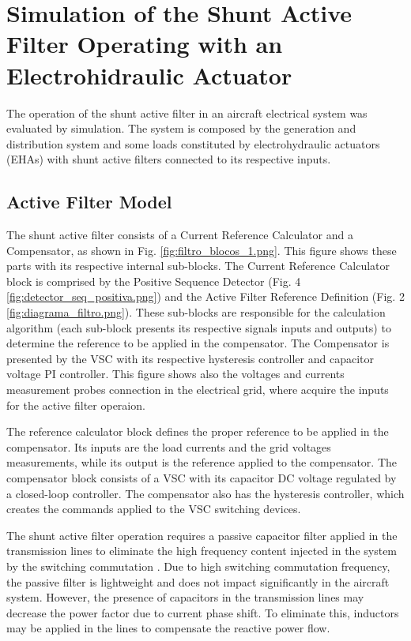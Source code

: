 \section{Simulation of the Shunt Active Filter Operating with an Electrohidraulic Actuator}

The operation of the shunt active filter in an aircraft electrical system was evaluated by simulation. The system is composed by the generation and distribution system and some loads constituted by electrohydraulic actuators (EHAs) with shunt active filters connected to its respective inputs.

\subsection{Active Filter Model}

The shunt active filter consists of a Current Reference Calculator and a Compensator, as shown in Fig. \ref{fig:filtro_blocos_1.png}. This figure shows these parts with its respective internal sub-blocks. The Current Reference Calculator block is comprised by the Positive Sequence Detector (Fig. 4 \ref{fig:detector_seq_positiva.png}) and the Active Filter Reference Definition (Fig. 2 \ref{fig:diagrama_filtro.png}). These sub-blocks are responsible for the calculation algorithm (each sub-block presents its respective signals inputs and outputs) to determine the reference to be applied in the compensator. The Compensator is presented by the VSC with its respective hysteresis controller and capacitor voltage PI controller. This figure shows also the voltages and currents measurement probes connection in the electrical grid, where acquire the inputs for the active filter operaion.

The reference calculator block defines the proper reference to be applied in the compensator. Its inputs are the load currents and the grid voltages measurements, while its output is the reference applied to the compensator. The compensator block consists of a VSC with its capacitor DC voltage regulated by a closed-loop controller. The compensator also has the hysteresis controller, which creates the commands applied to the VSC switching devices.

The shunt active filter operation requires a passive capacitor filter applied in the transmission lines to eliminate the high frequency content injected in the system by the switching commutation \cite{Akagi2007}. Due to high switching commutation frequency, the passive filter is lightweight and does not impact significantly in the aircraft system. However, the presence of capacitors in the transmission lines may decrease the power factor due to current phase shift. To eliminate this, inductors may be applied in the lines to compensate the reactive power flow.

